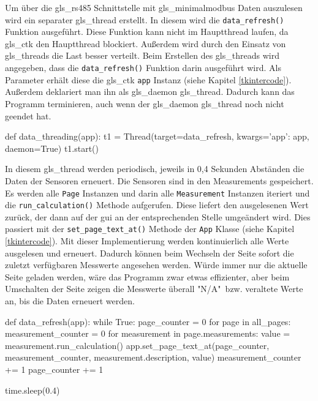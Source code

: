 \label{auslesen_rlt_parameter}

Um über die \gls{gls_rs485} Schnittstelle mit \gls{gls_minimalmodbus} Daten auszulesen wird ein separater \gls{gls_thread} erstellt. In diesem wird die \lstinline{data_refresh()} Funktion ausgeführt. Diese Funktion kann nicht im Hauptthread laufen, da \gls{gls_ctk} den Hauptthread blockiert. Außerdem wird durch den Einsatz von \gls{gls_thread}s die Last besser verteilt. Beim Erstellen des \gls{gls_thread}s wird angegeben, dass die \lstinline{data_refresh()} Funktion darin ausgeführt wird. Als Parameter erhält diese die \gls{gls_ctk} \lstinline{app} Instanz (siehe Kapitel \ref{tkintercode}). Außerdem deklariert man ihn als \gls{gls_daemon} \gls{gls_thread}. Dadurch kann das Programm terminieren, auch wenn der \gls{gls_daemon} \gls{gls_thread} noch nicht geendet hat.

\begin{pythoncode}
def data_threading(app):
	t1 = Thread(target=data_refresh, kwargs={'app': app}, daemon=True)
	t1.start()
\end{pythoncode}

In diesem \gls{gls_thread} werden periodisch, jeweils in 0,4 Sekunden Abständen die Daten der Sensoren erneuert. Die Sensoren sind in den Measurements gespeichert. Es werden alle \lstinline{Page} Instanzen und darin alle \lstinline{Measurement} Instanzen iteriert und die \lstinline{run_calculation()} Methode aufgerufen. Diese liefert den ausgelesenen Wert zurück, der dann auf der \acs{gui} an der entsprechenden Stelle umgeändert wird. Dies passiert mit der \lstinline{set_page_text_at()} Methode der \lstinline{App} Klasse (siehe Kapitel \ref{tkintercode}). 
\newline Mit dieser Implementierung werden kontinuierlich alle Werte ausgelesen und erneuert. Dadurch können beim Wechseln der Seite sofort die zuletzt verfügbaren Messwerte angesehen werden. Würde immer nur die aktuelle Seite geladen werden, wäre das Programm zwar etwas effizienter, aber beim Umschalten der Seite zeigen die Messwerte überall "N/A"\ bzw. veraltete Werte an, bis die Daten erneuert werden. 

\begin{pythoncode}
def data_refresh(app):
	while True:
		page_counter = 0
		for page in all_pages:
			measurement_counter = 0
			for measurement in page.measurements:
				value = measurement.run_calculation()
				app.set_page_text_at(page_counter, measurement_counter, measurement.description, value)
				measurement_counter += 1
			page_counter += 1
		
		time.sleep(0.4)
\end{pythoncode}

